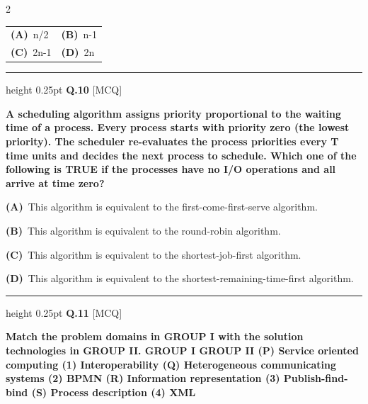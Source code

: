 \documentclass[a4paper,10pt,twoside]{article}
\begin{document}
\begin{multicols}{2}
\par\vspace{2pt}\noindent
\begin{tabular*}{\columnwidth}{@{\extracolsep{\fill}}p{}p{}@{}}
\textbf{(A)}~n/2 & \textbf{(B)}~n-1 \\
\addlinespace[2pt]
\textbf{(C)}~2n-1 & \textbf{(D)}~2n
\end{tabular*}
\par\vspace{6pt}\hrule height 0.25pt\vspace{6pt}
\noindent\textbf{Q.10} \hfill {\footnotesize\textsf{[MCQ]}}
\par\vspace{2pt}
{\bfseries A scheduling algorithm assigns priority proportional to the waiting time of a process. Every process
starts with priority zero (the lowest priority). The scheduler re-evaluates the process priorities every
T time units and decides the next process to schedule. Which one of the following is TRUE if the
processes have no I/O operations and all arrive at time zero? \par}
\par\vspace{2pt}\noindent
\textbf{(A)}~This algorithm is equivalent to the first-come-first-serve algorithm.\par\vspace{2pt}\noindent
\textbf{(B)}~This algorithm is equivalent to the round-robin algorithm.\par\vspace{2pt}\noindent
\textbf{(C)}~This algorithm is equivalent to the shortest-job-first algorithm.\par\vspace{2pt}\noindent
\textbf{(D)}~This algorithm is equivalent to the shortest-remaining-time-first algorithm.
\par\vspace{6pt}\hrule height 0.25pt\vspace{6pt}
\noindent\textbf{Q.11} \hfill {\footnotesize\textsf{[MCQ]}}
\par\vspace{2pt}
{\bfseries Match the problem domains in GROUP I with the solution technologies in GROUP II.
GROUP I
GROUP II
(P) Service oriented computing
(1) Interoperability
(Q) Heterogeneous communicating systems
(2) BPMN
(R) Information representation
(3) Publish-find-bind
(S) Process description
(4) XML \par}
\par\vspace{2pt}\noindent

\end{multicols}
\end{document}
